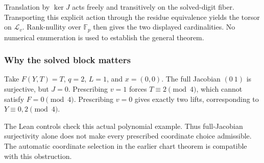 Translation by \(\ker J\) acts freely and transitively on the
solved-digit fiber. Transporting this explicit action through the
residue equivalence yields the torsor on \(\mathcal L_v\). Rank-nullity
over \(\mathbb F_p\) then gives the two displayed cardinalities. No
numerical enumeration is used to establish the general theorem.

\hypertarget{cont8:why-the-solved-block-matters}{%
\subsubsection{Why the solved block
matters}\label{cont8:why-the-solved-block-matters}}

Take \(F(Y,T)=T\), \(q=2\), \(L=1\), and \(x=(0,0)\). The full Jacobian
\((0\ 1)\) is surjective, but \(J=0\). Prescribing \(v=1\) forces
\(T\equiv2\pmod4\), which cannot satisfy \(F=0\pmod4\). Prescribing
\(v=0\) gives exactly two lifts, corresponding to \(Y\equiv0,2\pmod4\).

The Lean controls check this actual polynomial example. Thus
full-Jacobian surjectivity alone does not make every prescribed
coordinate choice admissible. The automatic coordinate selection in the
earlier chart theorem is compatible with this obstruction.

